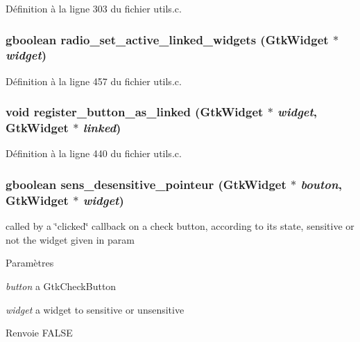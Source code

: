 Définition à la ligne 303 du fichier utils.c.

\subsubsection[{radio\_\-set\_\-active\_\-linked\_\-widgets}]{\setlength{\rightskip}{0pt plus 5cm}gboolean radio\_\-set\_\-active\_\-linked\_\-widgets (GtkWidget $\ast$ {\em widget})}\label{utils_8h_a055ba30be6b646e68d1b47934e392f1e}


Définition à la ligne 457 du fichier utils.c.

\subsubsection[{register\_\-button\_\-as\_\-linked}]{\setlength{\rightskip}{0pt plus 5cm}void register\_\-button\_\-as\_\-linked (GtkWidget $\ast$ {\em widget}, \/  GtkWidget $\ast$ {\em linked})}\label{utils_8h_a84c3531f5b0d92c5099a458bbf5df7cc}


Définition à la ligne 440 du fichier utils.c.

\subsubsection[{sens\_\-desensitive\_\-pointeur}]{\setlength{\rightskip}{0pt plus 5cm}gboolean sens\_\-desensitive\_\-pointeur (GtkWidget $\ast$ {\em bouton}, \/  GtkWidget $\ast$ {\em widget})}\label{utils_8h_ad678079f1b9eb979a0766e9dcbec0fd3}
called by a \char`\"{}clicked\char`\"{} callback on a check button, according to its state, sensitive or not the widget given in param


\begin{DoxyParams}{Paramètres}
\item[{\em button}]a GtkCheckButton \item[{\em widget}]a widget to sensitive or unsensitive\end{DoxyParams}
\begin{DoxyReturn}{Renvoie}
FALSE 
\end{DoxyReturn}


